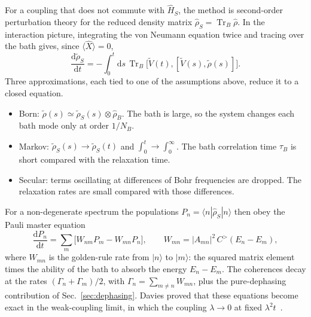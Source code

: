\documentclass[10pt,a4paper]{article}
\newcommand{\dd}{\mathrm{d}}
\newcommand{\Tr}{\operatorname{Tr}}
\begin{document}
For a coupling that does not commute with $ \hat H_S $, the method is second-order perturbation theory for the reduced density matrix $ \hat\rho_S = \Tr_B \hat\rho $.
In the interaction picture, integrating the von Neumann equation twice and tracing over the bath gives, since $ \langle\hat X\rangle = 0 $,
\begin{equation}
  \frac{\dd\tilde\rho_S}{\dd t} = -\int_0^t \dd s \, \Tr_B \big[ \tilde V(t), [\tilde V(s), \tilde\rho(s)] \big] .
  \label{eq:born-exact}
\end{equation}
Three approximations, each tied to one of the assumptions above, reduce it to a closed equation.
\begin{itemize}[leftmargin=1.5em]
\item Born: $ \tilde\rho(s) \simeq \tilde\rho_S(s) \otimes \hat\rho_B $. The bath is large, so the system changes each bath mode only at order $ 1/N_B $.
\item Markov: $ \tilde\rho_S(s) \to \tilde\rho_S(t) $ and $ \int_0^t \to \int_0^\infty $. The bath correlation time $ \tau_B $ is short compared with the relaxation time.
\item Secular: terms oscillating at differences of Bohr frequencies are dropped. The relaxation rates are small compared with those differences.
\end{itemize}
For a non-degenerate spectrum the populations $ P_n = \langle n | \hat\rho_S | n \rangle $ then obey the Pauli master equation~\cite{Pauli1928,vanHove1955,Breuer2002}
\begin{equation}
  \frac{\dd P_n}{\dd t} = \sum_m \big[ W_{nm} P_m - W_{mn} P_n \big] ,
  \qquad
  W_{mn} = |A_{mn}|^2 \, C^>(E_n - E_m) ,
  \label{eq:pauli}
\end{equation}
where $ W_{mn} $ is the golden-rule rate from $ |n\rangle $ to $ |m\rangle $: the squared matrix element times the ability of the bath to absorb the energy $ E_n - E_m $.
The coherences decay at the rates $ (\Gamma_n + \Gamma_m)/2 $, with $ \Gamma_n = \sum_{m\neq n} W_{mn} $, plus the pure-dephasing contribution of Sec.~\ref{sec:dephasing}.
Davies proved that these equations become exact in the weak-coupling limit, in which the coupling $ \lambda \to 0 $ at fixed $ \lambda^2 t $~\cite{Davies1974}.
\end{document}
